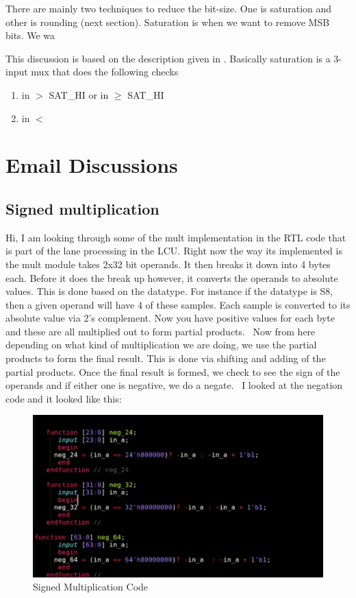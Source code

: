 There are mainly two techniques to reduce the bit-size. One is saturation and other is rounding (next section). Saturation is when we want to remove MSB bits. We wa


This discussion is based on the description given in \cite{ucdavis_sat}. Basically saturation is a 3-input mux that does the following checks

\begin{enumerate}
	\item in $>$ SAT\_HI or in $\geq$ SAT\_HI
	\item in $<$
\end{enumerate}






\section{Email Discussions}

\subsection{Signed multiplication}

Hi,
I am looking through some of the mult implementation in the RTL code that is part of the lane processing in the LCU.
Right now the way its implemented is the mult module takes 2x32 bit operands. It then breaks it down into 4 bytes each. Before it does the break up however, it converts the operands to absolute values. This is done based on the datatype. For instance if the datatype is S8, then a given operand will have 4 of these samples. Each sample is converted to its absolute value via 2's complement. Now you have positive values for each byte and these are all multiplied out to form partial products. 
Now from here depending on what kind of multiplication we are doing, we use the partial products to form the final result. This is done via shifting and adding of the partial products. Once the final result is formed, we check to see the sign of the operands and if either one is negative, we do a negate. 
I looked at the negation code and it looked like this:
 
	\begin{figure}[h]
		\centering
  		\includegraphics[width=0.8\linewidth]{SignedMul.png}
  		\caption{Signed Multiplication Code}
  		\label{fig:SignedMul}
  	\end{figure} 

